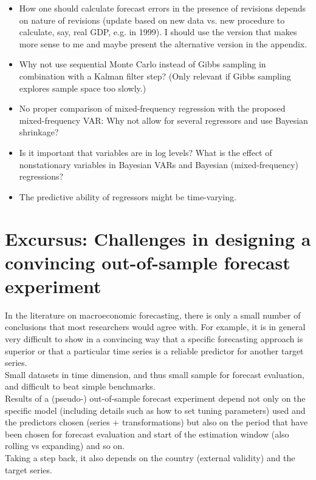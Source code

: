\documentclass[12pt,a4paper]{scrartcl}
\begin{document}
\begin{itemize}
	\item How one should calculate forecast errors in the presence of revisions depends on nature of revisions (update based on new data vs. new procedure to calculate, say, real GDP, e.g. in 1999). I should use the version that makes more sense to me and maybe present the alternative version in the appendix.
	\item Why not use sequential Monte Carlo instead of Gibbs sampling in combination with a Kalman filter step? (Only relevant if Gibbs sampling explores sample space too slowly.)
	\item No proper comparison of mixed-frequency regression with the proposed mixed-frequency VAR: Why not allow for several regressors and use Bayesian shrinkage?
	\item Is it important that variables are in log levels? What is the effect of nonstationary variables in Bayesian VARs and Bayesian (mixed-frequency) regressions?
	\item The predictive ability of regressors might be time-varying.
\end{itemize}

\section{Excursus: Challenges in designing a convincing out-of-sample forecast experiment}

In the literature on macroeconomic forecasting, there is only a small number of conclusions that most researchers would agree with. For example, it is in general very difficult to show in a convincing way that a specific forecasting approach is superior or that a particular time series is a reliable predictor for another target series.\\

Small datasets in time dimension, and thus small sample for forecast evaluation, and difficult to beat simple benchmarks.\\

Results of a (pseudo-) out-of-sample forecast experiment depend not only on the specific model (including details such as how to set tuning parameters) used and the predictors chosen (series + transformations) but also on the period that have been chosen for forecast evaluation and start of the estimation window (also rolling vs expanding) and so on. \\

Taking a step back, it also depends on the country (external validity) and the target series.\\
\end{document}
